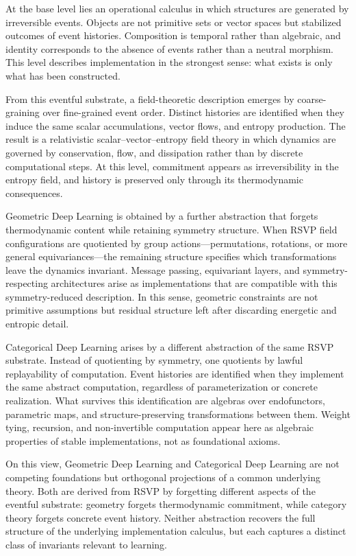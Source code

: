\documentclass[11pt]{article}
\begin{document}
At the base level lies an operational calculus in which structures are generated
by irreversible events. Objects are not primitive sets or vector spaces but
stabilized outcomes of event histories. Composition is temporal rather than
algebraic, and identity corresponds to the absence of events rather than a
neutral morphism. This level describes implementation in the strongest sense:
what exists is only what has been constructed.

From this eventful substrate, a field-theoretic description emerges by
coarse-graining over fine-grained event order. Distinct histories are identified
when they induce the same scalar accumulations, vector flows, and entropy
production. The result is a relativistic scalar–vector–entropy field theory in
which dynamics are governed by conservation, flow, and dissipation rather than
by discrete computational steps. At this level, commitment appears as
irreversibility in the entropy field, and history is preserved only through its
thermodynamic consequences.

Geometric Deep Learning is obtained by a further abstraction that forgets
thermodynamic content while retaining symmetry structure. When RSVP field
configurations are quotiented by group actions—permutations, rotations, or more
general equivariances—the remaining structure specifies which transformations
leave the dynamics invariant. Message passing, equivariant layers, and symmetry-
respecting architectures arise as implementations that are compatible with this
symmetry-reduced description. In this sense, geometric constraints are not
primitive assumptions but residual structure left after discarding energetic
and entropic detail.

Categorical Deep Learning arises by a different abstraction of the same RSVP
substrate. Instead of quotienting by symmetry, one quotients by lawful
replayability of computation. Event histories are identified when they implement
the same abstract computation, regardless of parameterization or concrete
realization. What survives this identification are algebras over endofunctors,
parametric maps, and structure-preserving transformations between them. Weight
tying, recursion, and non-invertible computation appear here as algebraic
properties of stable implementations, not as foundational axioms.

On this view, Geometric Deep Learning and Categorical Deep Learning are not
competing foundations but orthogonal projections of a common underlying theory.
Both are derived from RSVP by forgetting different aspects of the eventful
substrate: geometry forgets thermodynamic commitment, while category theory
forgets concrete event history. Neither abstraction recovers the full structure
of the underlying implementation calculus, but each captures a distinct class
of invariants relevant to learning.
\end{document}
